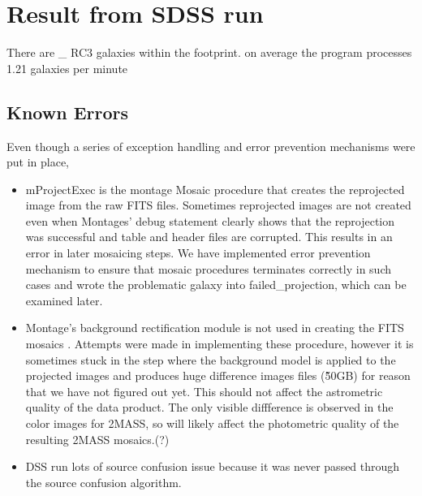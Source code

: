 \documentclass[5p]{elsarticle}
\begin{document}
\section{Result from SDSS run}
There are \_ RC3 galaxies within the footprint. 
on average the program processes 1.21 galaxies per minute
	\subsection{Known Errors}
	Even though a series of exception handling and error prevention mechanisms were put in place, 
	 	\begin{itemize}
	 		\item mProjectExec is the montage Mosaic procedure that creates the reprojected image from the raw FITS files. Sometimes reprojected images are not created even when Montages' debug statement clearly shows that the reprojection was successful and table and header files are corrupted. This results in an error in later mosaicing steps. We have implemented error prevention mechanism to ensure that mosaic procedures terminates correctly in such cases and wrote the problematic galaxy into failed\_projection, which can be examined later.
	 		\item Montage's background rectification module is not used in creating the FITS mosaics . Attempts were made in implementing these procedure, however it  is sometimes stuck in the step where the background model is applied to the projected images and  produces huge difference images files (\~50GB) for reason that we have not figured out yet. This should not affect the astrometric quality of the data product. The only visible diffference is observed in the color images for 2MASS, so will likely affect the photometric quality of the resulting 2MASS mosaics.(?)
	 	  \item DSS run lots of source confusion issue because it was never passed through the source confusion algorithm. 
	 	\end{itemize}
	
\end{document}
